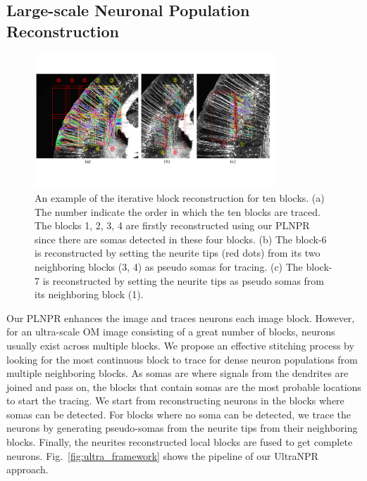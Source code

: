 \subsection{Large-scale Neuronal Population Reconstruction}
\label{sec:UltraNPR}

\begin{figure}[t]
	\centering
	\includegraphics[width=0.8\textwidth]{./Illustrations/ultranpr_block_search.pdf}
	\caption{An example of the iterative block reconstruction for ten blocks. (a) The number indicate the order in which the ten blocks are traced. The blocks 1, 2, 3, 4 are firstly reconstructed using our PLNPR since there are somas detected in these four blocks. (b) The block-6 is reconstructed by setting the neurite tips (red dots) from its two neighboring blocks (3, 4) as pseudo somas for tracing. (c) The block-7 is reconstructed by setting the neurite tips   as pseudo somas from its neighboring block (1).}
	\label{fig:blocksearch}
\end{figure}


Our PLNPR enhances the image  and traces neurons  each image block.
However, for an ultra-scale OM image consisting of a great number of blocks, neurons usually exist across multiple blocks. 
We propose an effective stitching process by looking for the most continuous block to trace for dense neuron populations from multiple neighboring blocks. 
%
As somas are where signals from the dendrites are joined and pass on, the blocks that contain somas are the most probable locations to start the tracing.
We start from reconstructing neurons in the blocks where somas can be detected.
For blocks where no soma can be detected, we trace the neurons by generating pseudo-somas from the neurite tips from their neighboring blocks. 
%
Finally, the neurites reconstructed  local blocks are fused to get complete neurons. 
Fig.~\ref{fig:ultra_framework} shows the pipeline of our UltraNPR approach. 


